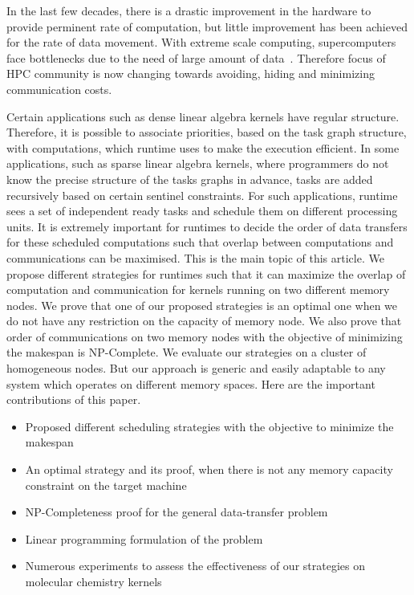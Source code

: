 \documentclass[runningheads]{llncs} %
\begin{document}
	 In the last few decades, there is a drastic improvement in the hardware to provide perminent rate of computation, but little improvement has been achieved for the rate of data movement. With extreme scale computing, supercomputers face bottlenecks due to the need of large amount of data~\cite{ascaccommitteereport2014,yelick2016}. Therefore focus of HPC community is now changing towards avoiding, hiding and minimizing communication costs.
	 
	
	Certain applications such as dense linear algebra kernels have regular structure. Therefore, it is possible to associate priorities, based on the task graph structure, with computations, which runtime uses to make the execution efficient. In some applications, such as sparse linear algebra kernels, where programmers do not know the precise structure of the tasks graphs in advance,  tasks are added recursively based on certain sentinel constraints. For such applications, runtime sees a set of independent ready tasks and schedule them on different processing units. It is extremely important for runtimes to decide the order of data transfers for these scheduled computations such that overlap between computations and communications can be maximised. This is the main topic of this article. We propose different strategies for runtimes such that it can maximize the overlap of computation and communication for kernels running on two different memory nodes. We prove that one of our proposed strategies is an optimal one when we do not have any restriction on the capacity of memory node. We also prove that order of communications on two memory nodes  with the objective of minimizing the makespan is  NP-Complete. We evaluate our strategies on a cluster of homogeneous nodes. But our approach is generic and easily adaptable to any system which operates on different memory spaces. Here are the important contributions of this paper.
	
	\renewcommand{\labelitemi}{$\bullet$}
	\begin{itemize}
		\item Proposed different scheduling strategies with the objective to minimize the makespan
		\item An optimal strategy and its proof, when there is not any memory capacity constraint on the target machine
		\item NP-Completeness proof for the general data-transfer problem  
		\item Linear programming formulation of the problem
		\item Numerous  experiments to assess the effectiveness of our strategies on molecular chemistry kernels 
	\end{itemize}
\end{document}
